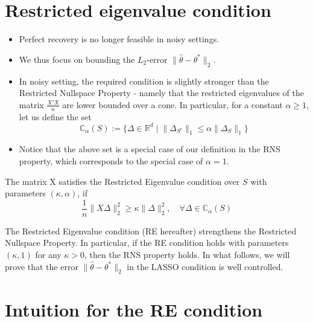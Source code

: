 \documentclass[10pt,handout,english]{beamer}
\newcommand{\R}{\mathbb{R}}
\newcommand{\C}{\mathbb{C}}
\begin{document}
\section{Restricted eigenvalue condition}
\begin{frame}[allowframebreaks]
\begin{itemize}
\setlength\itemsep{0.5em}
\item Perfect recovery is no longer feasible in noisy settings. 
\justifying
\item We thus focus on bounding the $L_{2}$-error $\lVert\hat{\theta}-\theta^{*}\rVert_{2}$. 
\justifying
\item In noisy setting, the required condition is slightly stronger than the Restricted Nullspace Property - namely that the restricted eigenvalues of the matrix $\frac{X'X}{n}$ are lower bounded over a cone. In particular, for a constant $\alpha\geq1$, let us define the set
\[
\C_{\alpha}(S):=\{\Delta\in\R^{d}\mid\lVert\Delta_{S^{c}}\rVert_{1}\leq\alpha\lVert\Delta_{S}\rVert_{1}\}
\]
\justifying
\item Notice that the above set is a special case of our definition in the RNS property, which corresponds to the special case of $\alpha=1$.
\justifying
\end{itemize}
\begin{definition}

The matrix X satisfies the Restricted Eigenvalue condition over $S$ with parameters $(\kappa,\alpha)$, if
\[
\frac{1}{n}\lVert X\Delta\rVert_{2}^{2}\geq\kappa\lVert\Delta\rVert_{2}^{2},\quad\forall\Delta\in\C_{\alpha}(S)
\]
\end{definition}
The Restricted Eigenvalue condition (RE hereafter) strengthens the Restricted Nullspace Property. In particular, if the RE condition holds with parameters $(\kappa,1)$ for any $\kappa>0$, then the RNS property holds. In what follows, we will prove that the error $\lVert\hat{\theta}-\theta^{*}\rVert_{2}$ in the LASSO condition is well controlled.
\end{frame}

\section{Intuition for the RE condition}
\end{document}
